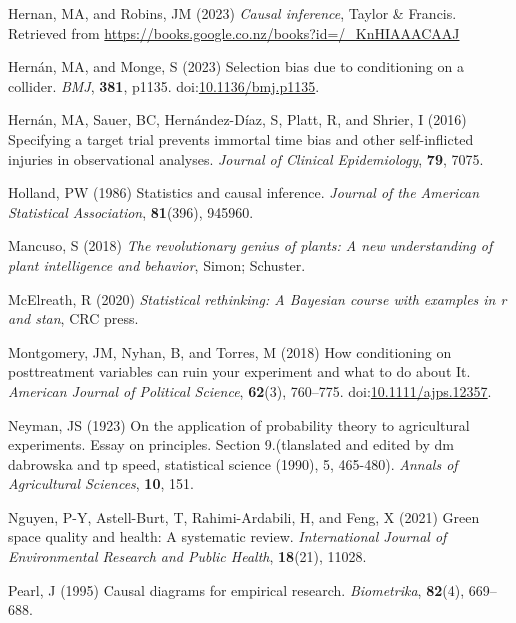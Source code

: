 \documentclass[
  singlecolumn]{article}
\newlength{\cslhangindent}
\newenvironment{CSLReferences}[2] %
 {\begin{list}{}{%
  \setlength{\itemindent}{0pt}
  \setlength{\leftmargin}{0pt}
  \setlength{\parsep}{0pt}
  \ifodd #1
   \setlength{\leftmargin}{\cslhangindent}
   \setlength{\itemindent}{-1\cslhangindent}
  \fi
  \setlength{\itemsep}{#2\baselineskip}}}
 {\end{list}}
\begin{document}
\begin{CSLReferences}{1}{0}
Hernan, MA, and Robins, JM (2023) \emph{Causal inference}, Taylor \&
Francis. Retrieved from
\url{https://books.google.co.nz/books?id=/_KnHIAAACAAJ}

Hernán, MA, and Monge, S (2023) Selection bias due to conditioning on a
collider. \emph{BMJ}, \textbf{381}, p1135.
doi:\href{https://doi.org/10.1136/bmj.p1135}{10.1136/bmj.p1135}.

Hernán, MA, Sauer, BC, Hernández-Díaz, S, Platt, R, and Shrier, I (2016)
Specifying a target trial prevents immortal time bias and other
self-inflicted injuries in observational analyses. \emph{Journal of
Clinical Epidemiology}, \textbf{79}, 7075.

Holland, PW (1986) Statistics and causal inference. \emph{Journal of the
American Statistical Association}, \textbf{81}(396), 945960.

Mancuso, S (2018) \emph{The revolutionary genius of plants: A new
understanding of plant intelligence and behavior}, Simon; Schuster.

McElreath, R (2020) \emph{Statistical rethinking: A {B}ayesian course
with examples in r and stan}, CRC press.

Montgomery, JM, Nyhan, B, and Torres, M (2018) How conditioning on
posttreatment variables can ruin your experiment and what to do about
It. \emph{American Journal of Political Science}, \textbf{62}(3),
760--775.
doi:\href{https://doi.org/10.1111/ajps.12357}{10.1111/ajps.12357}.

Neyman, JS (1923) On the application of probability theory to
agricultural experiments. Essay on principles. Section 9.(tlanslated and
edited by dm dabrowska and tp speed, statistical science (1990), 5,
465-480). \emph{Annals of Agricultural Sciences}, \textbf{10}, 151.

Nguyen, P-Y, Astell-Burt, T, Rahimi-Ardabili, H, and Feng, X (2021)
Green space quality and health: A systematic review. \emph{International
Journal of Environmental Research and Public Health}, \textbf{18}(21),
11028.

Pearl, J (1995) Causal diagrams for empirical research.
\emph{Biometrika}, \textbf{82}(4), 669--688.


\end{CSLReferences}
\end{document}
